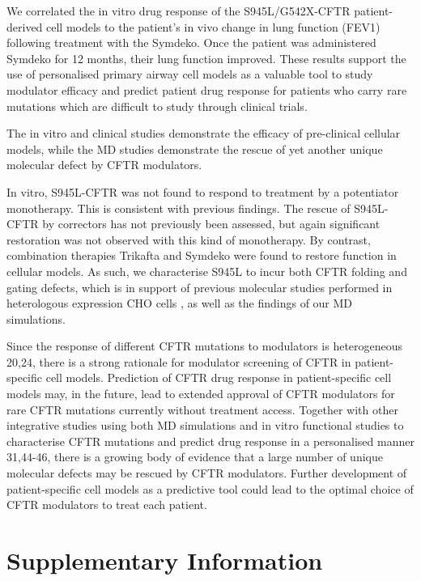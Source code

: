 We correlated the in vitro drug response of the S945L/G542X-CFTR patient-derived cell models to the patient’s in vivo change in lung function (FEV1) following treatment with the Symdeko. Once the patient was administered Symdeko for 12 months, their lung function improved. These results support the use of personalised primary airway cell models as a valuable tool to study modulator efficacy and predict patient drug response for patients who carry rare mutations which are difficult to study through clinical trials. 

The in vitro and clinical studies demonstrate the efficacy of pre-clinical cellular models, while the MD studies demonstrate the rescue of yet another unique molecular defect by CFTR modulators.  

In vitro, S945L-CFTR was not found to respond to treatment by a potentiator monotherapy. This is consistent with previous findings. The rescue of S945L-CFTR by correctors has not previously been assessed, but again significant restoration was not observed with this kind of monotherapy. By contrast, combination therapies Trikafta and Symdeko were found to restore function in cellular models. As such, we characterise S945L to incur both CFTR folding and gating defects, which is in support of previous molecular studies performed in heterologous expression CHO cells \cite{seibert1996}, as well as the findings of our MD simulations.

Since the response of different CFTR mutations \cite{laselva2021} to modulators is heterogeneous \cite{wainwright2015,boyle2014} 20,24, there is a strong rationale for modulator screening of CFTR in patient-specific cell models. Prediction of CFTR drug response in patient-specific cell models may, in the future, lead to extended approval of CFTR modulators for rare CFTR mutations currently without treatment access. Together with other integrative studies using both MD simulations and in vitro functional studies to characterise CFTR mutations and predict drug response in a personalised manner \cite{wong2022,wong2022a,billet2020,sabusap2021} 31,44-46, there is a growing body of evidence that a large number of unique molecular defects may be rescued by CFTR modulators. Further development of patient-specific cell models as a predictive tool could lead to the optimal choice of CFTR modulators to treat each patient.  

\section {Supplementary Information}
\renewcommand{\thefigure}{\arabic{chapter}.S\arabic{figure}}
\setcounter{figure}{0}

